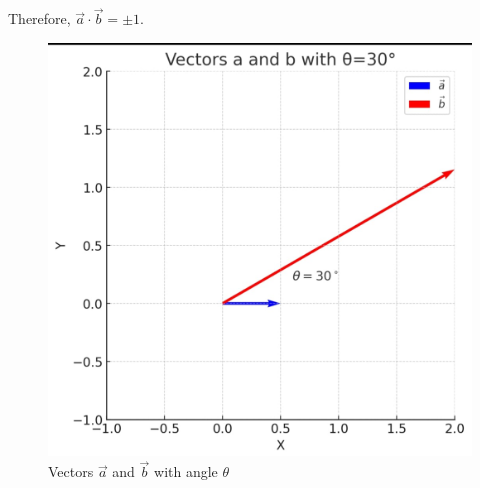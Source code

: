 \documentclass[journal]{IEEEtran}
\begin{document}
\centering
Therefore, $\vec{a} \cdot \vec{b} = \pm 1$.
\newpage
\begin{figure}[H]
    \centering
    \includegraphics[width=0.7\columnwidth]{figs/fig2.3.9.jpeg}
    \caption{Vectors $\vec{a}$ and $\vec{b}$ with angle $\theta$}
    \label{fig:placeholder}
\end{figure}
\end{document}

